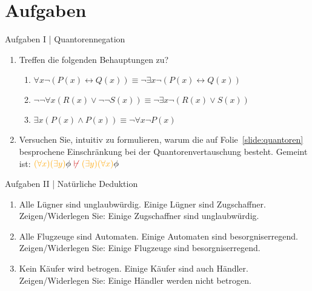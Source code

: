 \section{Aufgaben}

\begin{frame}
  {Aufgaben I | Quantorennegation}
  \onslide<+->
  \onslide<+->
  \begin{enumerate}
    \item Treffen die folgenden Behauptungen zu?\\
      \Halbzeile
      \begin{enumerate}
        \item $\forall x \neg(P(x)\leftrightarrow Q(x))\equiv\neg\exists x\neg(P(x)\leftrightarrow Q(x))$
        \item $\neg\neg\forall x(R(x)\vee\neg\neg S(x))\equiv\neg\exists x\neg (R(x)\vee S(x))$
        \item $\exists x (P(x)\wedge P(x))\equiv\neg\forall x\neg P(x)$
      \end{enumerate}
      \Zeile
    \item Versuchen Sie, intuitiv zu formulieren, warum die auf Folie~\ref{slide:quantoren} besprochene Einschränkung bei der Quantorenvertauschung besteht.
      Gemeint ist: $\orongsch{(\forall x)(\exists y)}\phi\ \rot{\not\vdash}\ \orongsch{(\exists y)(\forall x)}\phi$
  \end{enumerate}
\end{frame}

\begin{frame}
  {Aufgaben II | Natürliche Deduktion}
  \onslide<+->
  \begin{enumerate}
    \item Alle L\"ugner sind unglaubw\"urdig. Einige L\"ugner sind Zugschaffner.\\ \alert{Zeigen/Widerlegen Sie: Einige Zugschaffner sind unglaubw\"urdig.}
    \item Alle Flugzeuge sind Automaten. Einige Automaten sind besorgniserregend.\\ \alert{Zeigen/Widerlegen Sie: Einige Flugzeuge sind besorgniserregend.}
    \item Kein K\"aufer wird betrogen. Einige K\"aufer sind auch H\"andler.\\ \alert{Zeigen/Widerlegen Sie: Einige H\"andler werden nicht betrogen.}
\end{enumerate}
 
\end{frame}
